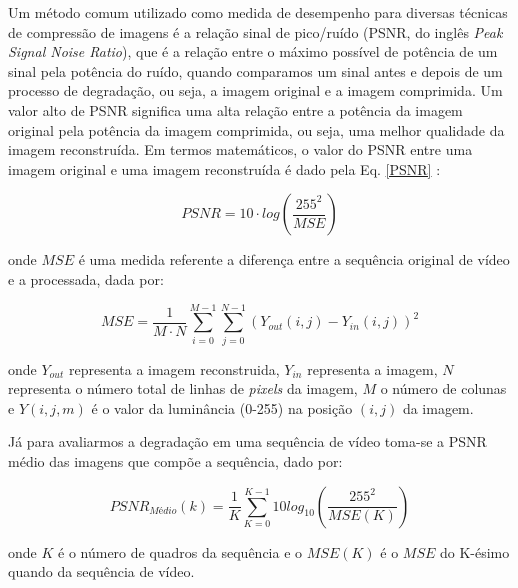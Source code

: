 Um método comum utilizado como medida de desempenho para diversas técnicas de compressão de imagens é a relação sinal de pico/ruído (PSNR, do inglês \textit{Peak Signal Noise Ratio}), que é a relação entre o máximo possível de potência de um sinal pela potência do ruído, quando comparamos um sinal antes e depois de um
processo de degradação, ou seja, a imagem original e a imagem comprimida. Um valor alto de PSNR significa uma alta relação entre a potência da imagem original pela potência da imagem comprimida, ou seja, uma melhor qualidade da imagem reconstruída. Em termos matemáticos, o valor do PSNR entre uma imagem original  e uma imagem reconstruída é dado pela Eq. \ref{PSNR} \cite{vergutz2013combinaccao} : 
\vspace{-3mm}
\begin{center}
	\begin{equation}
		\label{PSNR}
		PSNR = 10\cdot log\left(\displaystyle\frac{255^2}{MSE}\right)
	\end{equation}
\end{center}

\noindent onde $MSE$ é uma medida referente a diferença entre a sequência original de vídeo e a processada, dada por:
\vspace{-5mm}
\begin{center}
	\begin{equation}
		MSE = \displaystyle\frac{1}{M\cdot N}\sum_{i=0}^{M-1}\sum_{j=0}^{N-1} (Y_{out}(i,j) - Y_{in}(i,j))^2 
	\end{equation}
\end{center} 	
onde $Y_{out}$ representa a imagem reconstruida, $Y_{in}$ representa a imagem, $N$ representa o número total de linhas de \textit{pixels} da imagem, $M$ o número de colunas  e $Y(i,j,m)$ é o valor  da luminância (0-255) na posição $(i,j)$ da imagem.

Já para avaliarmos a degradação em uma sequência de vídeo toma-se a PSNR médio das imagens que compõe a sequência, dado por:
\vspace{-5mm}
\begin{center}
	\begin{equation}
		PSNR_{Médio}(k) = \displaystyle\frac{1}{K}\sum_{K=0}^{K-1} 10log_{10}\left(\frac{255^2}{MSE(K)}\right)
	\end{equation}
\end{center}

\noindent onde $K$ é o número de quadros da sequência e o $MSE(K)$ é o $MSE$ do K-ésimo quando da sequência de vídeo.
